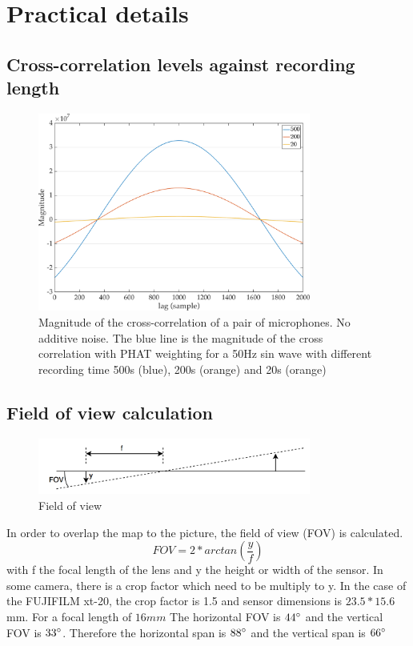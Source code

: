 \chapter{Practical details}



\section{Cross-correlation levels against recording length}
\begin{figure}[H]
    \centering
    \includegraphics[width=0.8\textwidth]{Figures/20200500.png}
    \caption{Magnitude of the cross-correlation of a pair of microphones. No additive noise. The blue line is the magnitude of the cross correlation with PHAT weighting for a 50Hz sin wave with different recording time 500s (blue), 200s (orange) and 20s (orange)}
    \label{fig:xcorr20500hz}
\end{figure}

\section{Field of view calculation}
\begin{figure}[H]
    \centering
    \includegraphics[width=0.8\textwidth]{Figures/FOV.png}
    \caption{Field of view}
    \label{fig:fov}
\end{figure}
In order to overlap the map to the picture, the field of view (FOV) is calculated.
\begin{equation}
    FOV = 2 * arctan(\frac{y}{f})
\end{equation}
with f the focal length of the lens and y the height or width of the sensor. In some camera, there is a crop factor which need to be multiply to y. In the case of the FUJIFILM xt-20, the crop factor is 1.5 and sensor dimensions is $23.5*15.6$mm. For a focal length of $16mm$ The horizontal FOV is $44\degree$ and the vertical FOV is $33\degree$. Therefore the horizontal span is $88\degree$ and the vertical span is $66\degree$

